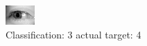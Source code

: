 \begin{figure}[h!]
\begin{center}
\includegraphics[width=0.60\columnwidth]{figures/ID3210_class_3_target_4.png}
\end{center}
\caption{ Classification: 3 actual target: 4}
\label{fig:ID3210_class_3_target_4}
\end{figure}
